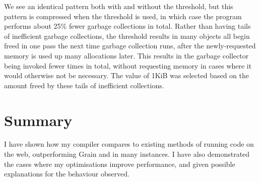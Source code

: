 We see an identical pattern both with and without the threshold, but this pattern is compressed when the threshold is used, in which case the program performs about 25\% fewer garbage collections in total.  
Rather than having tails of inefficient garbage collections, the threshold results in many objects all begin freed in one pass the next time garbage collection runs, after the newly-requested memory is used up many allocations later. This results in the garbage collector being invoked fewer times in total, without requesting memory in cases where it would otherwise not be necessary. The value of 1KiB was selected based on the amount freed by these tails of inefficient collections.

\section{Summary}
I have shown how my compiler compares to existing methods of running code on the web, outperforming Grain and \jsofocaml{} in many instances. I have also demonstrated the cases where my optimisations improve performance, and given possible explanations for the behaviour observed.













